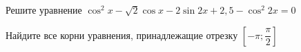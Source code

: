 \begin{ex}
	\begin{condition}
		\begin{enumcols}[label=\asbuk*)]
			\item Решите уравнение \( \cos^2 x -\sqrt{2}\cos x -2\sin 2x +2,5-\cos^2 2x = 0  \)
			\item Найдите все корни уравнения, принадлежащие отрезку \( \left[-\pi;\dfrac{\pi}{2}\right] \)
		\end{enumcols}
	\end{condition}
\end{ex}